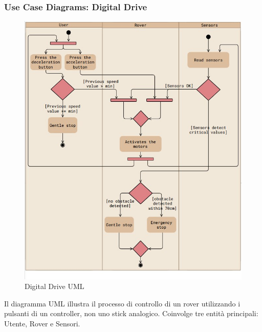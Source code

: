 \documentclass{article}
\begin{document}
      \subsubsection{Use Case Diagrams: Digital Drive}
        \begin{figure}[h]
          \includegraphics[width=0.7\linewidth]{../Use_Case_Diagram/Digital_Drive.jpg}
          \centering
          \caption{Digital Drive UML}
        \end{figure}
        Il diagramma UML illustra il processo di controllo di un rover utilizzando i pulsanti di un controller, non uno stick analogico. Coinvolge tre entità principali: Utente, Rover e Sensori.
\end{document}
